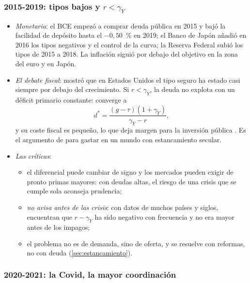 \documentclass[11pt]{article}
\begin{document}
\subsubsection{2015-2019: tipos bajos y \texorpdfstring{$r<\gamma_Y$}{r < gamma}}\label{sec:fase-tipos-bajos}

\begin{itemize}
\item \emph{Monetaria}: el BCE empezó a comprar deuda pública en 2015 y bajó la facilidad de depósito hasta el $-0{,}50$~\% en 2019; el Banco de Japón añadió en 2016 los tipos negativos y el control de la curva; la Reserva Federal subió los tipos de 2015 a 2018\nocite{BCE2026APP,BCE2026Tipos,BoJ2016Negativo,BoJ2016YCC,FedNY2026EFFR}. La inflación siguió por debajo del objetivo en la zona del euro y en Japón.
\item \emph{El debate fiscal}: \textcite{Blanchard2019Deuda} mostró que en Estados Unidos el tipo seguro ha estado casi siempre por debajo del crecimiento. Si $r<\gamma_Y$, la deuda no explota con un déficit primario constante: converge a
  \begin{equation}
  d^*=\frac{(g-\tau)(1+\gamma_Y)}{\gamma_Y-r}, \label{eq:deuda-estable}
  \end{equation}
  y su coste fiscal es pequeño, lo que deja margen para la inversión pública  . Es el argumento de  para gastar en un mundo con estancamiento secular.
\item \emph{Las críticas}:
  \begin{itemize}
  \item el diferencial puede cambiar de signo y los mercados pueden exigir de pronto primas mayores: con deudas altas, el riesgo de una crisis que se cumple sola aconseja prudencia\nocite{Wyplosz2019Wonderland};
  \item \emph{no avisa antes de las crisis}: con datos de muchos países y siglos, \textcite{MauroZhou2020rg} encuentran que $r-\gamma_Y$ ha sido negativo con frecuencia y no era mayor antes de los impagos;
  \item el problema no es de demanda, sino de oferta, y se resuelve con reformas, no con deuda\nocite{Cochrane2019Summers} (\ref{sec:estancamiento}).
  \end{itemize}
\end{itemize}

\subsubsection{2020-2021: la Covid, la mayor coordinación}\label{sec:fase-covid}
\end{document}
